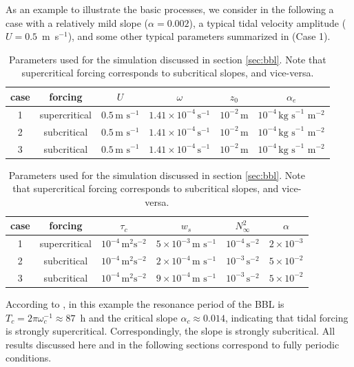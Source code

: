 As an example to illustrate the basic processes, we consider in the
following a case with a relatively mild slope ($\alpha=0.002$), a
typical tidal velocity amplitude ($U=0.5$~m~s$^{-1}$), and some other
typical parameters summarized in  (Case 1). 
\begin{table}[h]
\caption{Parameters used for the simulation discussed in section
  \ref{sec:bbl}. Note that supercritical forcing corresponds to
  subcritical slopes, and vice-versa.}\label{params}
\begin{center}
\begin{tabular}{cccccc}
case  & forcing & $U$ & $\omega$ & $z_0$ & $\alpha_e$ \\
\hline
1 & supercritical & $0.5 \, \text{m s}^{-1}$ & $1.41 \times 10^{-4} \, 
\text{s}^{-1}$ & 
$10^{-2}\,\text{m}$ & $10^{-4} \, \text{kg 
s}^{-1}\text{ m}^{-2}$  \\
\hline
2 & subcritical & $0.5 \, \text{m 
s}^{-1}$ & $1.41 \times 
10^{-4} \, 
\text{s}^{-1}$ & 
$10^{-2}\,\text{m}$ & $10^{-4} \, \text{kg 
s}^{-1}\text{ m}^{-2}$\\
\hline
3 & subcritical & $0.5 \, \text{m 
s}^{-1}$ & $1.41 \times 
10^{-4} \, 
\text{s}^{-1}$ & 
$10^{-2}\,\text{m}$ & $10^{-4} \, \text{kg 
s}^{-1}\text{ m}^{-2}$\\
\end{tabular}
\newline
\begin{tabular}{cccccc}
case & forcing & $\tau_c$ & $w_s$ & 
$N^2_\infty$ & 
$\alpha$ \\
\hline 
1 & supercritical & $10^{-4} \, \text{m}^2 \text{s}^{-2}$ & $5 \times 10^{-3}\,\text{m s}^{-1}$ & 
$10^{-4}\,\text{s}^{-2}$ & $2 \times 10^{-3}$ \\
\hline
2 & subcritical & $10^{-4} \, \text{m}^2 \text{s}^{-2}$ & $2 \times 
10^{-4}\,\text{m s}^{-1}$ & 
$10^{-3}\,\text{s}^{-2}$ & $5 \times 10^{-2}$\\
\hline 
3 & subcritical & $10^{-4} \, \text{m}^2 \text{s}^{-2}$ & 
 $9 \times 10^{-4}\,\text{m s}^{-1}$  & 
$10^{-3}\,\text{s}^{-2}$ & $5 \times 10^{-2}$\\
\end{tabular}
\end{center}
\end{table}

According to
, in this example the resonance period of the BBL is $T_c =
2 \pi \omega_c^{-1} \approx 87$~h and the critical slope $\alpha_c
\approx 0.014$, indicating that tidal forcing is strongly
supercritical. Correspondingly, the slope is strongly subcritical. All
results discussed here and in the following sections correspond to
fully periodic conditions.

